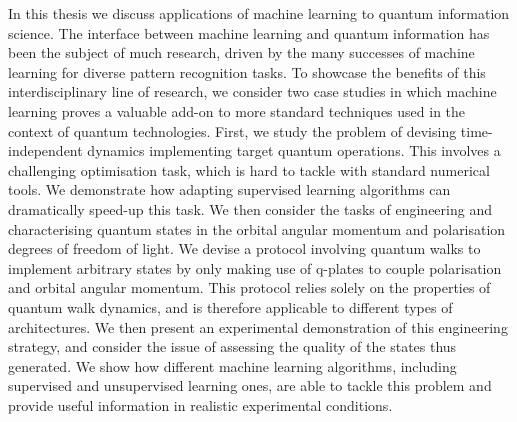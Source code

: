 In this thesis we discuss applications of machine learning to quantum information science.
The interface between machine learning and quantum information has been the subject of much research, driven by the many successes of machine learning for diverse pattern recognition tasks.
To showcase the benefits of this interdisciplinary line of research, we consider two case studies in which machine learning proves a valuable add-on to more standard techniques used in the context of quantum technologies.
First, we study the problem of devising time-independent dynamics implementing target quantum operations.
This involves a challenging optimisation task, which is hard to tackle with standard numerical tools.
We demonstrate how adapting supervised learning algorithms can dramatically speed-up this task.
We then consider the tasks of engineering and characterising quantum states in the orbital angular momentum and polarisation degrees of freedom of light.
We devise a protocol involving quantum walks to implement arbitrary states by only making use of q-plates to couple polarisation and orbital angular momentum.
This protocol relies solely on the properties of quantum walk dynamics, and is therefore applicable to different types of architectures.
We then present an experimental demonstration of this engineering strategy, and consider the issue of assessing the quality of the states thus generated.
We show how different machine learning algorithms, including supervised and unsupervised learning ones, are able to tackle this problem and provide useful information in realistic experimental conditions.


\clearpage


\tableofcontents



\clearpage

